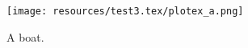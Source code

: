 \begin{figure}[h]
  \texttt{[image: resources/test3.tex/plotex\_a.png]}
  \caption{A boat.}
  \label{fig:boat1}
\end{figure}